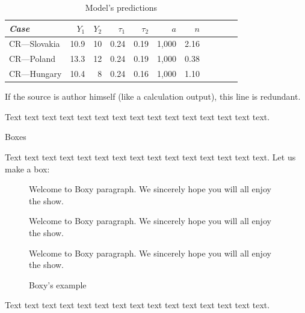 \begin{table}[!htbp]
\begin{center}
	\caption[Calibration table]{Model's predictions}\label{tab:values}
\begin{tabular}{lrrrrrrrrrr}
\toprule
\textit{Case} &        $Y_1$ &        $Y_2$ &  $\tau_1$ &  $\tau_2$ &          $a$ &          $n$\\
\midrule
CR---Slovakia &       10.9 &         10 &       0.24 &       0.19 &          1,000 &       2.16\\

CR---Poland &       13.3 &         12 &       0.24 &       0.19 &          1,000 &       0.38\\

CR---Hungary &       10.4 &          8 &       0.24 &       0.16 &          1,000 &        1.10\\
\bottomrule
\end{tabular}  
\end{center}
\begin{source} If the source is author himself (like a calculation output), this line is redundant.\end{source}
\end{table}

Text text text text text text text text text text text text text text text.

Boxes

Text text text text text text text text text text text text text text text. Let us make a box:

\begin{figure}[!htbp]
\begin{center}
\caption{Boxy's example}\label{box:values}
\begin{boxeditemize}
	\item Welcome to Boxy paragraph. 
We sincerely hope you will
all enjoy the show.
	\item
Welcome to Boxy paragraph.
We sincerely hope you will
all enjoy the show.
	\item 
Welcome to Boxy paragraph.
We sincerely hope you will
all enjoy the show.
\end{boxeditemize}
\end{center}
\begin{source}\cite{Haaparanta1996}\end{source}
\end{figure}

Text text text text text text text text text text text text text text text.

